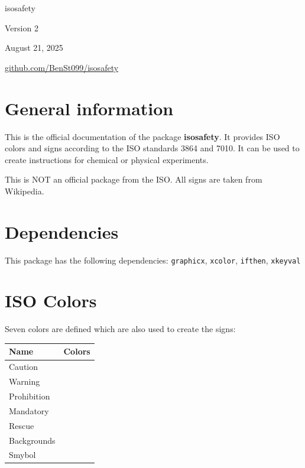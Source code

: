 \documentclass{article}
\begin{document}
\begin{center}
    {\Huge isosafety} \vspace{5mm}

    {\Large Version 2}\vspace{5mm}

    {\Large August 21, 2025}\vspace{5mm}

    \href{https://github.com/BenSt099/isosafety}{github.com/BenSt099/isosafety} 
\end{center}\vspace{5mm}

\section{General information}

This is the official documentation of the package \textbf{isosafety}. It provides ISO colors and signs according to the ISO standards
3864 and 7010. It can be used to create instructions for chemical or physical experiments.\vspace{5mm}


\noindent This is NOT an official package from the ISO. All signs are taken from Wikipedia.

\section{Dependencies}

This package has the following dependencies: \texttt{graphicx}, \texttt{xcolor}, \texttt{ifthen}, \texttt{xkeyval}

\section{ISO Colors}

Seven colors are defined which are also used to create the signs: \vspace{5mm}

\renewcommand{\arraystretch}{1.2}
    \begin{tabular}{|l|l|}
        \hline
        \textbf{Name} & \textbf{Colors} \\ 
        \hline
        Caution & \cellcolor{Caution} \\
        Warning & \cellcolor{Warning} \\
        Prohibition & \cellcolor{Prohibition} \\
        Mandatory & \cellcolor{Mandatory} \\
        Rescue & \cellcolor{Rescue} \\
        Backgrounds & \cellcolor{Backgrounds} \\
        Smybol & \cellcolor{Symbol} \\
        \hline
\end{tabular}\vspace{5mm}
\end{document}
